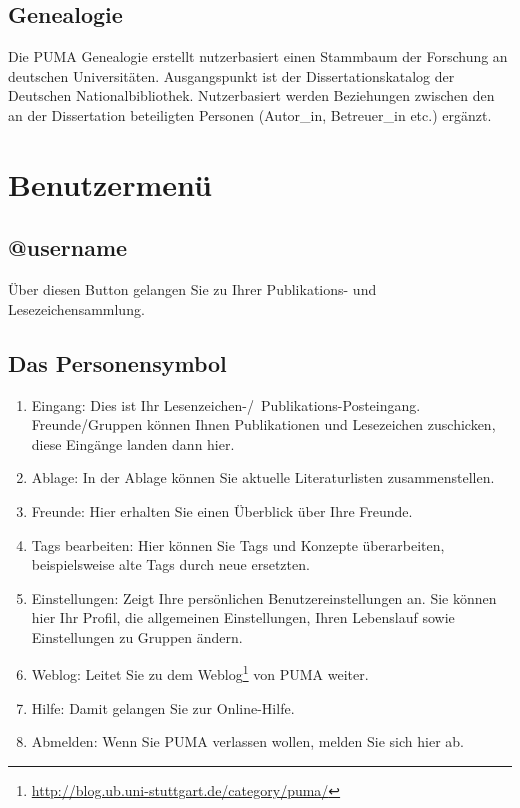 \subsection{Genealogie}
\label{subsec:genealogie}
Die PUMA Genealogie erstellt nutzerbasiert einen Stammbaum der Forschung an deutschen Universitäten. Ausgangspunkt ist der Dissertationskatalog der Deutschen Nationalbibliothek. Nutzerbasiert werden Beziehungen zwischen den an der Dissertation beteiligten Personen (Autor\_in, Betreuer\_in etc.) ergänzt.

\section{Benutzermenü}
\label{sec:benutzermenue}
\subsection{@username}
\label{subsec:username}
Über diesen Button gelangen Sie zu Ihrer Publikations- und Lesezeichensammlung. 
\subsection{Das Personensymbol}
\label{subsec:Personensymbol}
\begin{enumerate}
    \item Eingang: Dies ist Ihr Lesenzeichen-/~Publikations-Posteingang. Freunde/Gruppen können Ihnen Publikationen und Lesezeichen zuschicken, diese Eingänge landen dann hier.
    \item Ablage: In der Ablage können Sie aktuelle Literaturlisten zusammenstellen. 
    \item Freunde: Hier erhalten Sie einen Überblick über Ihre Freunde. 
    \item Tags bearbeiten: Hier können Sie Tags und Konzepte überarbeiten, beispielsweise alte Tags durch neue ersetzten. 
    \item Einstellungen: Zeigt Ihre persönlichen Benutzereinstellungen an. Sie können hier Ihr Profil, die allgemeinen Einstellungen, Ihren Lebenslauf sowie Einstellungen zu Gruppen ändern.
    \item Weblog: Leitet Sie zu dem Weblog\footnote{\url{http://blog.ub.uni-stuttgart.de/category/puma/}} von PUMA weiter.
    \item Hilfe: Damit gelangen Sie zur Online-Hilfe.
    \item Abmelden: Wenn Sie PUMA verlassen wollen, melden Sie sich hier ab. 
\end{enumerate}

